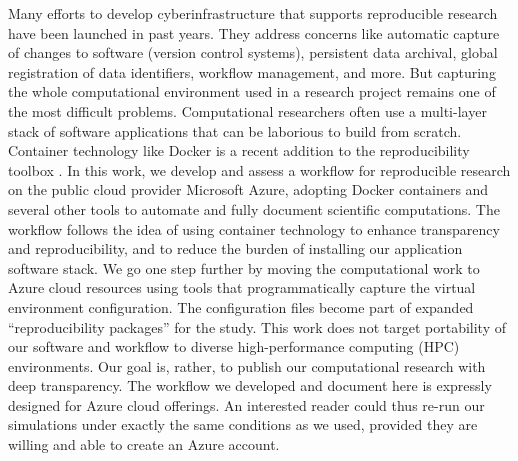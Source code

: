 \documentclass[10pt,journal,compsoc]{IEEEtran}
\begin{document}
Many efforts to develop cyberinfrastructure that supports reproducible research have been launched in past years. 
They address concerns like automatic capture of changes to software (version control systems), persistent data archival, global registration of data identifiers, workflow management, and more. 
But capturing the whole computational environment used in a research project remains one of the most difficult problems. 
Computational researchers often use a multi-layer stack of software applications that can be laborious to build from scratch. 
Container technology like Docker is a recent addition to the reproducibility toolbox \cite{boettiger_2015}. 
In this work, we develop and assess a workflow for reproducible research on the public cloud provider Microsoft Azure, adopting Docker containers and several other tools to automate and fully document scientific computations.
The workflow follows the idea of using container technology to enhance transparency and reproducibility, and to reduce the burden of installing our application software stack.
We go one step further by moving the computational work to Azure cloud resources using tools that programmatically capture the virtual environment configuration.
The configuration files become part of expanded ``reproducibility packages'' for the study.
This work does not target portability of our software and workflow to diverse high-performance computing (HPC) environments. 
Our goal is, rather, to publish our computational research with deep transparency. 
The workflow we developed and document here is expressly designed for Azure  cloud offerings. 
An interested reader could thus re-run our simulations under exactly the same conditions as we used, provided they are willing and able to create an Azure account.
\end{document}
